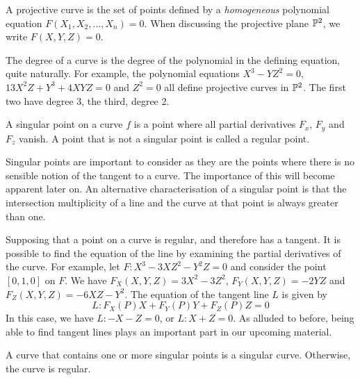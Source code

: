 \begin{definition}
	A projective curve is the set of points defined by a \emph{homogeneous} polynomial equation $F(X_1,X_2,\ldots,X_n) = 0$.
	When discussing the projective plane $\pn[2]$, we write $F(X,Y,Z) = 0$.
\end{definition}
The degree of a curve is the degree of the polynomial in the defining equation, quite naturally.
For example, the polynomial equations $X^3-YZ^2=0$, $13X^2Z + Y^3 + 4XYZ = 0$ and $Z^2=0$ all define projective curves in $\pn[2]$.
The first two have degree 3, the third, degree 2.

\begin{definition}
	A singular point on a curve $f$ is a point where all partial derivatives $F_x$, $F_y$ and $F_z$ vanish. A point that is not a singular point is called a regular point.
\end{definition}
Singular points are important to consider as they are the points where there is no sensible notion of the tangent to a curve.
The importance of this will become apparent later on.
An alternative characterisation of a singular point is that the intersection multiplicity of a line and the curve at that point is always greater than one.

Supposing that a point on a curve is regular, and therefore has a tangent.
It is possible to find the equation of the line by examining the partial derivatives of the curve.
For example, let $F: X^3 - 3XZ^2 - Y^2Z = 0$ and consider the point $[0,1,0]$ on $F$.
We have $F_X(X,Y,Z) = 3X^2 -3Z^2$, $F_Y(X,Y,Z) = -2YZ$ and $F_Z(X,Y,Z) = -6XZ - Y^2$.
The equation of the tangent line $L$ is given by
$$L : F_X(P)X + F_Y(P)Y + F_Z(P)Z = 0$$
In this case, we have $L : -X - Z = 0$, or $L: X + Z = 0$.
As alluded to before, being able to find tangent lines plays an important part in our upcoming material.

\begin{definition}
	A curve that contains one or more singular points is a singular curve. Otherwise, the curve is regular.
\end{definition}
